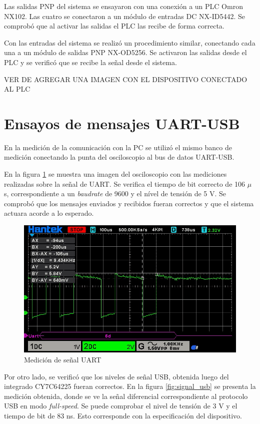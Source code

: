Las salidas PNP del sistema se ensayaron con una conexión a un PLC Omron NX102\citep{web_nx102}. Las cuatro se conectaron a un módulo de entradas DC NX-ID5442. Se comprobó que al activar las salidas el PLC las recibe de forma correcta.

Con las entradas del sistema se realizó un procedimiento similar, conectando cada una a un módulo de salidas PNP NX-OD5256. Se activaron las salidas desde el PLC y se verificó que se recibe la señal desde el sistema.

VER DE AGREGAR UNA IMAGEN CON EL DISPOSITIVO CONECTADO AL PLC

\section{Ensayos de mensajes UART-USB}

En la medición de la comunicación con la PC se utilizó el mismo banco de medición conectando la punta del osciloscopio al bus de datos UART-USB.

En la figura \ref{fig:signal_uart} se muestra una imagen del osciloscopio con las mediciones realizadas sobre la señal de UART. Se verifica el tiempo de bit correcto de 106 $\mu$s, correspondiente a un \textit{baudrate} de 9600 y el nível de tensión de 5 V. Se comprobó que los mensajes enviados y recibidos fueran correctos y que el sistema actuara acorde a lo esperado.

\begin{figure}[htbp]
	\centering
	\includegraphics[scale=0.6]{./Figures/bit_time_uart.jpeg}
	\caption{Medición de señal UART}
	\label{fig:signal_uart}
\end{figure}

Por otro lado, se verificó que los niveles de señal USB, obtenida luego del integrado CY7C64225 fueran correctos. En la figura \ref{fig:signal_usb} se presenta la medición obtenida, donde se ve la señal diferencial correspondiente al protocolo USB en modo \textit{full-speed}. Se puede comprobar el nivel de tensión de 3 V y el tiempo de bit de 83 ns. Esto corresponde con la especificación del dispositivo.

